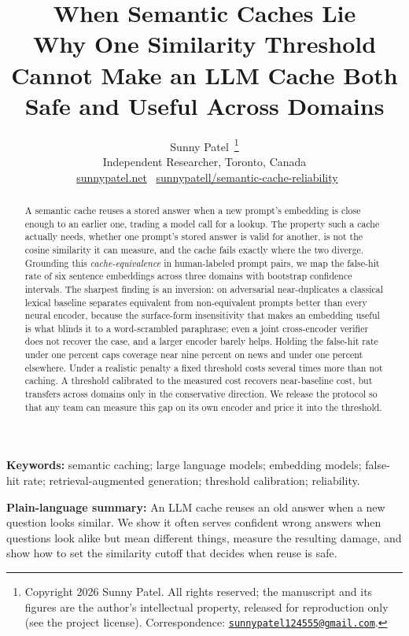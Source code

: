 \documentclass[11pt,letterpaper]{article}
\title{\bfseries When Semantic Caches Lie\\[5pt]
{\normalfont\large Why One Similarity Threshold Cannot Make an LLM Cache Both Safe and Useful Across Domains}}
\author{Sunny Patel\,\orcidlink{0009-0005-3863-7642}%
\thanks{\raggedright Copyright \textcopyright{} 2026 Sunny Patel. All rights reserved; the
manuscript and its figures are the author's intellectual property, released for reproduction
only (see the project license). Correspondence:
\href{mailto:sunnypatel124555@gmail.com}{\nolinkurl{sunnypatel124555@gmail.com}}.}\\[3pt]
\small Independent Researcher, Toronto, Canada\\[3pt]
\small \faGlobe~\href{https://www.sunnypatel.net}{sunnypatel.net}\quad\textbar\quad
\faGithub~\href{https://github.com/sunnypatell/semantic-cache-reliability}{sunnypatell/semantic-cache-reliability}}
\date{}
\begin{document}
\maketitle
\thispagestyle{firstpage}

\begin{abstract}
\setlength{\leftskip}{0.045\textwidth}\setlength{\rightskip}{0.045\textwidth}
\noindent
A semantic cache reuses a stored answer when a new prompt's embedding is close enough to an
earlier one, trading a model call for a lookup. The property such a cache actually needs,
whether one prompt's stored answer is valid for another, is not the cosine similarity it can
measure, and the cache fails exactly where the two diverge. Grounding this
\emph{cache-equivalence} in human-labeled prompt pairs, we map the false-hit rate of six
sentence embeddings across three domains with bootstrap confidence intervals. The sharpest
finding is an inversion: on adversarial near-duplicates a classical lexical baseline separates
equivalent from non-equivalent prompts better than every neural encoder, because the
surface-form insensitivity that makes an embedding useful is what blinds it to a word-scrambled
paraphrase; even a joint cross-encoder verifier does not recover the case, and a larger encoder
barely helps. Holding
the false-hit rate under one percent caps coverage near nine percent on news and under one
percent elsewhere. Under a realistic penalty a fixed threshold costs several times more than not
caching. A threshold calibrated to the measured cost recovers near-baseline cost, but transfers
across domains only in the conservative direction. We release the protocol so
that any team can measure this gap on its own encoder and price it into the threshold.
\end{abstract}

\begin{center}\begin{minipage}{0.91\textwidth}\small
\textbf{Keywords:} semantic caching; large language models; embedding models; false-hit rate;
retrieval-augmented generation; threshold calibration; reliability.

\smallskip\noindent
\textbf{Plain-language summary:} An LLM cache reuses an old answer when a new question looks
similar. We show it often serves confident wrong answers when questions look alike but mean
different things, measure the resulting damage, and show how to set the similarity cutoff that
decides when reuse is safe.
\end{minipage}\end{center}
\medskip
\end{document}
